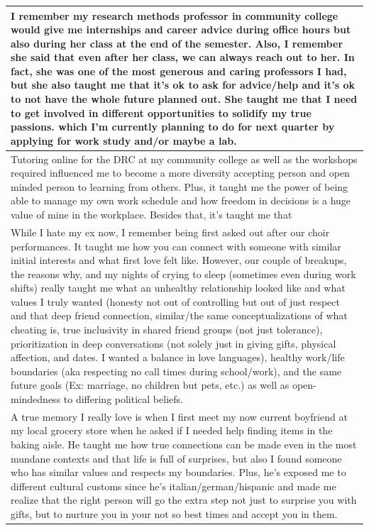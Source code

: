 \documentclass[
  .7em,
  letterpaper,
  DIV=11,
  numbers=noendperiod]{scrartcl}
\begin{document}
\begin{table}
\begin{tabular}{l}
\hline
I remember my research methods professor in community college would give me internships and career advice during office hours but also during her class at the end of the semester. Also, I remember she said that even after her class, we can always reach out to her. In fact, she was one of the most generous and caring professors I had, but she also taught me that it's ok to ask for advice/help and it's ok to not have the whole future planned out. She taught me that I need to get involved in different opportunities to solidify my true passions. which I'm currently planning to do for next quarter by applying for work study and/or maybe a lab.\\
\hline
Tutoring online for the DRC at my community college as well as the workshops required influenced me to become a more diversity accepting person and open minded person to learning from others. Plus, it taught me the power of being able to manage my own work schedule and how freedom in decisions is a huge value of mine in the workplace. Besides that, it's taught me that\\
\hline
While I hate my ex now, I remember being first asked out after our choir performances. It taught me how you can connect with someone with similar initial interests and what first love felt like. However, our couple of breakups, the reasons why, and my nights of crying to sleep (sometimes even during work shifts) really taught me what an unhealthy relationship looked like and what values I truly wanted (honesty not out of controlling but out of just respect and that deep friend connection, similar/the same conceptualizations of what cheating is, true inclusivity in shared friend groups (not just tolerance), prioritization in deep conversations (not solely just in giving gifts, physical affection, and dates. I wanted a balance in love languages), healthy work/life boundaries (aka respecting no call times during school/work), and the same future goals (Ex: marriage, no children but pets, etc.) as well as open-mindedness to differing political beliefs.\\
\hline
A true memory I really love is when I first meet my now current boyfriend at my local grocery store when he asked if I needed help finding items in the baking aisle. He taught me how true connections can be made even in the most mundane contexts and that life is full of surprises, but also I found someone who has similar values and respects my boundaries. Plus, he's exposed me to different cultural customs since he's italian/german/hispanic and made me realize that the right person will go the extra step not just to surprise you with gifts, but to nurture you in your not so best times and accept you in them.\\

\end{tabular}
\end{table}
\end{document}
